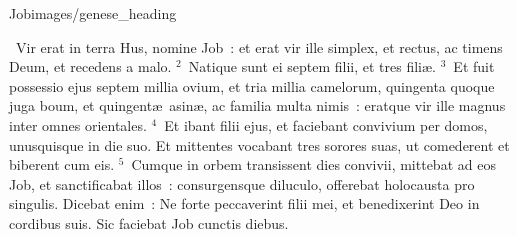 {Job}{images/genese_heading}

~\lettrine[lines=10,image=true,loversize=0.05,lraise=-0.03]{V}{}ir erat in terra Hus, nomine Job~: et erat vir ille simplex, et rectus, ac timens Deum, et recedens a malo.
${}^{2}$~Natique sunt ei septem filii, et tres fili\ae .
${}^{3}$~Et fuit possessio ejus septem millia ovium, et tria millia camelorum, quingenta quoque juga boum, et quingent\ae\ asin\ae , ac familia multa nimis~: eratque vir ille magnus inter omnes orientales.
${}^{4}$~Et ibant filii ejus, et faciebant convivium per domos, unusquisque in die suo. Et mittentes vocabant tres sorores suas, ut comederent et biberent cum eis.
${}^{5}$~Cumque in orbem transissent dies convivii, mittebat ad eos Job, et sanctificabat illos~: consurgensque diluculo, offerebat holocausta pro singulis. Dicebat enim~: Ne forte peccaverint filii mei, et benedixerint Deo in cordibus suis. Sic faciebat Job cunctis diebus.


